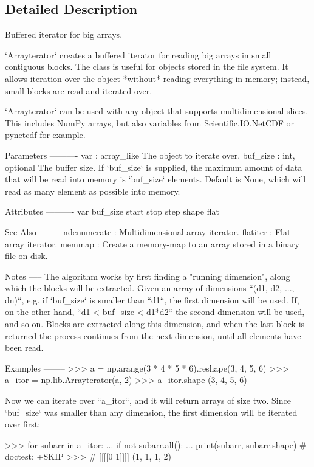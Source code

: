 \subsection{Detailed Description}
\begin{DoxyVerb}Buffered iterator for big arrays.

`Arrayterator` creates a buffered iterator for reading big arrays in small
contiguous blocks. The class is useful for objects stored in the
file system. It allows iteration over the object *without* reading
everything in memory; instead, small blocks are read and iterated over.

`Arrayterator` can be used with any object that supports multidimensional
slices. This includes NumPy arrays, but also variables from
Scientific.IO.NetCDF or pynetcdf for example.

Parameters
----------
var : array_like
    The object to iterate over.
buf_size : int, optional
    The buffer size. If `buf_size` is supplied, the maximum amount of
    data that will be read into memory is `buf_size` elements.
    Default is None, which will read as many element as possible
    into memory.

Attributes
----------
var
buf_size
start
stop
step
shape
flat

See Also
--------
ndenumerate : Multidimensional array iterator.
flatiter : Flat array iterator.
memmap : Create a memory-map to an array stored in a binary file on disk.

Notes
-----
The algorithm works by first finding a "running dimension", along which
the blocks will be extracted. Given an array of dimensions
``(d1, d2, ..., dn)``, e.g. if `buf_size` is smaller than ``d1``, the
first dimension will be used. If, on the other hand,
``d1 < buf_size < d1*d2`` the second dimension will be used, and so on.
Blocks are extracted along this dimension, and when the last block is
returned the process continues from the next dimension, until all
elements have been read.

Examples
--------
>>> a = np.arange(3 * 4 * 5 * 6).reshape(3, 4, 5, 6)
>>> a_itor = np.lib.Arrayterator(a, 2)
>>> a_itor.shape
(3, 4, 5, 6)

Now we can iterate over ``a_itor``, and it will return arrays of size
two. Since `buf_size` was smaller than any dimension, the first
dimension will be iterated over first:

>>> for subarr in a_itor:
...     if not subarr.all():
...         print(subarr, subarr.shape) # doctest: +SKIP
>>> # [[[[0 1]]]] (1, 1, 1, 2)\end{DoxyVerb}
 

